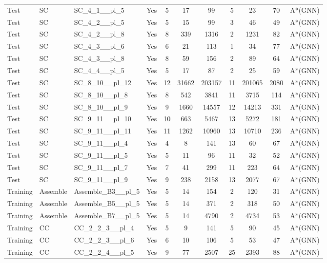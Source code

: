 \documentclass{article}
\begin{document}
\begin{tabular}{lllcccccccc}
Test & SC & SC\_4\_1\_\_pl\_5 & Yes & 5 & 17 & 99 & 5 & 23 & 70 & A*(GNN) \\
Test & SC & SC\_4\_2\_\_pl\_5 & Yes & 5 & 15 & 99 & 3 & 46 & 49 & A*(GNN) \\
Test & SC & SC\_4\_2\_\_pl\_8 & Yes & 8 & 339 & 1316 & 2 & 1231 & 82 & A*(GNN) \\
Test & SC & SC\_4\_3\_\_pl\_6 & Yes & 6 & 21 & 113 & 1 & 34 & 77 & A*(GNN) \\
Test & SC & SC\_4\_3\_\_pl\_8 & Yes & 8 & 59 & 156 & 2 & 89 & 64 & A*(GNN) \\
Test & SC & SC\_4\_4\_\_pl\_5 & Yes & 5 & 17 & 87 & 2 & 25 & 59 & A*(GNN) \\
Test & SC & SC\_8\_10\_\_pl\_12 & Yes & 12 & 31662 & 203157 & 11 & 201065 & 2080 & A*(GNN) \\
Test & SC & SC\_8\_10\_\_pl\_8 & Yes & 8 & 542 & 3841 & 11 & 3715 & 114 & A*(GNN) \\
Test & SC & SC\_8\_10\_\_pl\_9 & Yes & 9 & 1660 & 14557 & 12 & 14213 & 331 & A*(GNN) \\
Test & SC & SC\_9\_11\_\_pl\_10 & Yes & 10 & 663 & 5467 & 13 & 5272 & 181 & A*(GNN) \\
Test & SC & SC\_9\_11\_\_pl\_11 & Yes & 11 & 1262 & 10960 & 13 & 10710 & 236 & A*(GNN) \\
Test & SC & SC\_9\_11\_\_pl\_4 & Yes & 4 & 8 & 141 & 13 & 60 & 67 & A*(GNN) \\
Test & SC & SC\_9\_11\_\_pl\_5 & Yes & 5 & 11 & 96 & 11 & 32 & 52 & A*(GNN) \\
Test & SC & SC\_9\_11\_\_pl\_7 & Yes & 7 & 41 & 299 & 11 & 223 & 64 & A*(GNN) \\
Test & SC & SC\_9\_11\_\_pl\_9 & Yes & 9 & 238 & 2158 & 13 & 2077 & 67 & A*(GNN) \\
Training & Assemble & Assemble\_B3\_\_pl\_5 & Yes & 5 & 14 & 154 & 2 & 120 & 31 & A*(GNN) \\
Training & Assemble & Assemble\_B5\_\_pl\_5 & Yes & 5 & 14 & 371 & 2 & 318 & 50 & A*(GNN) \\
Training & Assemble & Assemble\_B7\_\_pl\_5 & Yes & 5 & 14 & 4790 & 2 & 4734 & 53 & A*(GNN) \\
Training & CC & CC\_2\_2\_3\_\_pl\_4 & Yes & 5 & 9 & 141 & 5 & 90 & 45 & A*(GNN) \\
Training & CC & CC\_2\_2\_3\_\_pl\_6 & Yes & 6 & 10 & 106 & 5 & 53 & 47 & A*(GNN) \\
Training & CC & CC\_2\_2\_4\_\_pl\_5 & Yes & 9 & 77 & 2507 & 25 & 2393 & 88 & A*(GNN) \\

\end{tabular}
\end{document}
